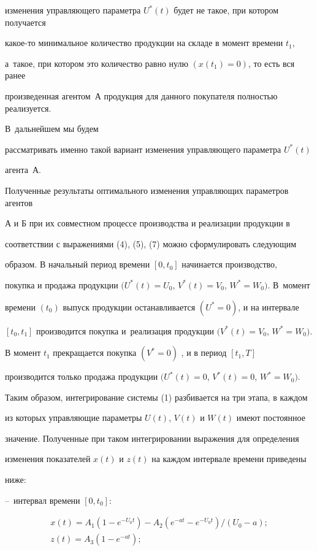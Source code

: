 изменения управляющего параметра $U^*(t)$ будет не такое, при котором получается

какое-то минимальное количество продукции на складе в момент времени $t_1$,

 а~такое, при котором это количество равно нулю $(x(t_1)=0)$, то есть вся ранее

произведенная агентом~А продукция для данного покупателя полностью реализуется.

В~дальнейшем мы будем

рассматривать именно такой вариант изменения управляющего параметра $U^*(t)$

агента~А.



Полученные результаты оптимального изменения управляющих параметров агентов

А и Б при их совместном процессе производства и реализации продукции в

соответствии с выражениями (4), (5), (7) можно сформулировать следующим

образом. В начальный период времени $[0, t_0]$ начинается производство,

покупка и продажа продукции $(U^*(t)=U_0$, $V^*(t)=V_0$, $W^*=W_0)$. В~момент

времени $(t_0)$ выпуск продукции останавливается $(U^*=0)$, и на интервале

$[t_0, t_1]$ производится покупка и~реализация продукции \mbox{$(V^*(t)=V_0$}, $W^*=W_0)$.

В момент $t_1$ прекращается покупка $(V^*=0)$ , и в период $[t_1, T]$

производится только продажа продукции $(U^*(t)=0$, $V^*(t)=0$, $W^*= W_0)$.

Таким образом, интегрирование системы (1) разбивается на три этапа, в каждом

из которых управляющие параметры $U(t)$, $V(t)$ и $W(t)$ имеют постоянное

значение. Полученные при таком интегрировании выражения для определения

изменения показателей $x(t)$ и $z(t)$ на каждом интервале времени приведены

ниже:



--~интервал времени $[0, t_0]:$

\begin{gather}

\label{f8}

   	x(t)=A_1(1-e^{-U_0t})-A_2(e^{-at}-e^{-U_0t})/(U_0-a);

   \\

\label{f9}

   	z(t)=A_3(1-e^{-at});

   \end{gather}





